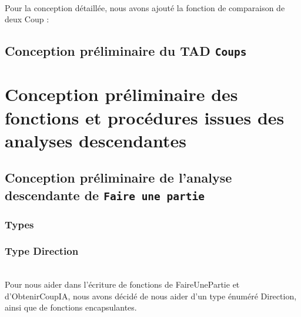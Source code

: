 ~\\
Pour la conception détaillée, nous avons ajouté la fonction de comparaison de deux \og Coup \fg{}  :
\begin{itemize}
\end{itemize}


\section{Conception préliminaire du TAD \tt{Coups}}
\begin{itemize}
\end{itemize}



\chapter{Conception préliminaire des fonctions et procédures issues des analyses descendantes}
\setcounter{section}{0}
\section{Conception préliminaire de l'analyse descendante de \tt{Faire une partie}}
\subsection{Types}
\begin{itemize}
\end{itemize}

\subsection{Type Direction}
~ \\
Pour nous aider dans l'écriture de fonctions de FaireUnePartie et d'ObtenirCoupIA, nous avons décidé de nous aider d'un type énuméré Direction, ainsi que de fonctions encapsulantes.

\begin{itemize}
\end{itemize}

